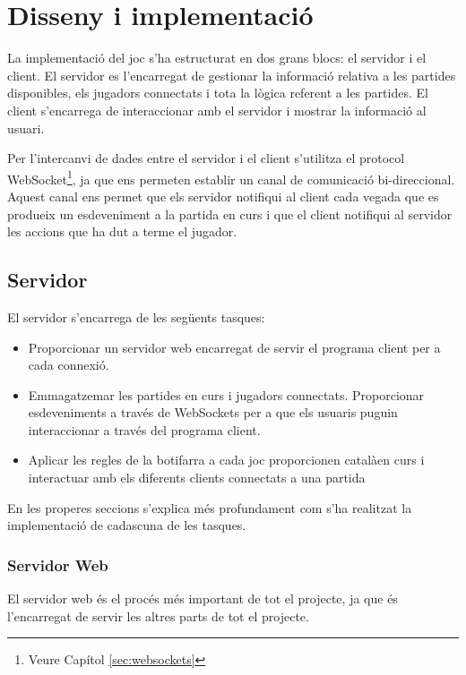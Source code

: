 \chapter{Disseny i implementació}
\label{chap:implementacio}

La implementació del joc s'ha estructurat en dos grans blocs: el servidor i el client. El servidor es l'encarregat de gestionar la informació relativa a les partides disponibles, els jugadors connectats i tota la lògica referent a les partides. El client s'encarrega de interaccionar amb el servidor i mostrar la informació al usuari. 

Per l'intercanvi de dades entre el servidor i el client s'utilitza el protocol WebSocket\footnote{Veure Capítol \ref{sec:websockets}},  ja que ens permeten establir un canal de comunicació bi-direccional. Aquest canal ens permet que els servidor notifiqui al client cada vegada que es produeix un esdeveniment a la partida en curs i que el client notifiqui al servidor les accions que ha dut a terme el jugador. 

\section{Servidor}

El servidor s'encarrega de les següents tasques: 

\begin{itemize}
\item{Proporcionar un servidor web encarregat de servir el programa client per a cada connexió.}
\item{Emmagatzemar les partides en curs i jugadors connectats. Proporcionar esdeveniments a través de WebSockets per a que els usuaris puguin interaccionar a través del programa client. }
\item{Aplicar les regles de la botifarra a cada joc proporcionen catalàen curs i interactuar amb els diferents clients connectats a una partida}
\end{itemize}

En les properes seccions s'explica més profundament com s'ha realitzat la implementació de cadascuna de les tasques. 

\subsection{Servidor Web}

El servidor web és el procés més important de tot el projecte, ja que és l'encarregat de servir les altres parts de tot el projecte. 

